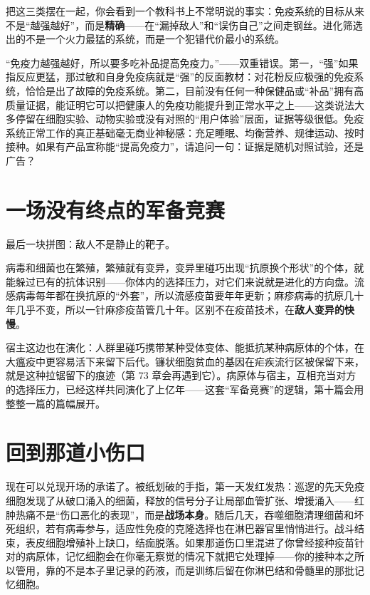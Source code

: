 把这三类摆在一起，你会看到一个教科书上不常明说的事实：免疫系统的目标从来不是“越强越好”，而是\textbf{精确}——在“漏掉敌人”和“误伤自己”之间走钢丝。进化筛选出的不是一个火力最猛的系统，而是一个犯错代价最小的系统。

\begin{wuqu}
“免疫力越强越好，所以要多吃补品提高免疫力。”——双重错误。第一，“强”如果指反应更猛，那过敏和自身免疫病就是“强”的反面教材：对花粉反应极强的免疫系统，恰恰是出了故障的免疫系统。第二，目前没有任何一种保健品或“补品”拥有高质量证据，能证明它可以把健康人的免疫功能提升到正常水平之上——这类说法大多停留在细胞实验、动物实验或没有对照的“用户体验”层面，证据等级很低。免疫系统正常工作的真正基础毫无商业神秘感：充足睡眠、均衡营养、规律运动、按时接种。如果有产品宣称能“提高免疫力”，请追问一句：证据是随机对照试验，还是广告？
\end{wuqu}

\section{一场没有终点的军备竞赛}

最后一块拼图：敌人不是静止的靶子。

病毒和细菌也在繁殖，繁殖就有变异，变异里碰巧出现“抗原换个形状”的个体，就能躲过已有的抗体识别——你体内的选择压力，对它们来说就是进化的方向盘。流感病毒每年都在换抗原的“外套”，所以流感疫苗要年年更新；麻疹病毒的抗原几十年几乎不变，所以一针麻疹疫苗管几十年。区别不在疫苗技术，在\textbf{敌人变异的快慢}。

宿主这边也在演化：人群里碰巧携带某种受体变体、能抵抗某种病原体的个体，在大瘟疫中更容易活下来留下后代。镰状细胞贫血的基因在疟疾流行区被保留下来，就是这种拉锯留下的痕迹（第 73 章会再遇到它）。病原体与宿主，互相充当对方的选择压力，已经这样共同演化了上亿年——这套“军备竞赛”的逻辑，第十篇会用整整一篇的篇幅展开。

\section{回到那道小伤口}

现在可以兑现开场的承诺了。被纸划破的手指，第一天发红发热：巡逻的先天免疫细胞发现了从破口涌入的细菌，释放的信号分子让局部血管扩张、增援涌入——红肿热痛不是“伤口恶化的表现”，而是\textbf{战场本身}。随后几天，吞噬细胞清理细菌和坏死组织，若有病毒参与，适应性免疫的克隆选择也在淋巴器官里悄悄进行。战斗结束，表皮细胞增殖补上缺口，结痂脱落。如果那道伤口里混进了你曾经接种疫苗针对的病原体，记忆细胞会在你毫无察觉的情况下就把它处理掉——你的接种本之所以管用，靠的不是本子里记录的药液，而是训练后留在你淋巴结和骨髓里的那批记忆细胞。

